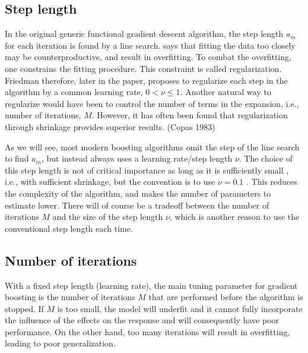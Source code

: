 \subsection{Step length}
In the original generic functional gradient descent algorithm, the step length $a_m$ for each iteration is found by a line search.
\citet{friedman2001} says that fitting the data too closely may be counterproductive, and result in overfitting. To combat the overfitting, one constrains the fitting procedure. This constraint is called regularization. Friedman therefore, later in the paper, proposes to regularize each step in the algorithm by a common learning rate, $0<\nu\leq1$. Another natural way to regularize would have been to control the number of terms in the expansion, i.e., number of iterations, $M$. However, it has often been found that regularization through shrinkage provides superior results. (Copas 1983) 

As we will see, most modern boosting algorithms omit the step of the line search to find $a_m$, but instead always uses a learning rate/step length $\nu$.  
The choice of this step length is not of critical importance as long as it is sufficiently small \citep{schmid-hothorn}, i.e., with sufficient shrinkage, but the convention is to use $\nu=0.1$ \citep{mayr14a}. This reduces the complexity of the algorithm, and makes the number of parameters to estimate lower. There will of course be a tradeoff between the number of iterations $M$ and the size of the step length $\nu$, which is another reason to use the conventional step length each time.

\subsection{Number of iterations}\label{subsec:iterations}
With a fixed step length (learning rate), the main tuning parameter for gradient boosting is the number of iterations $M$ that are performed before the algorithm is stopped. If $M$ is too small, the model will underfit and it cannot fully incorporate the influence of the effects on the response and will consequently have poor performance. On the other hand, too many iterations will result in overfitting, leading to poor generalization.

